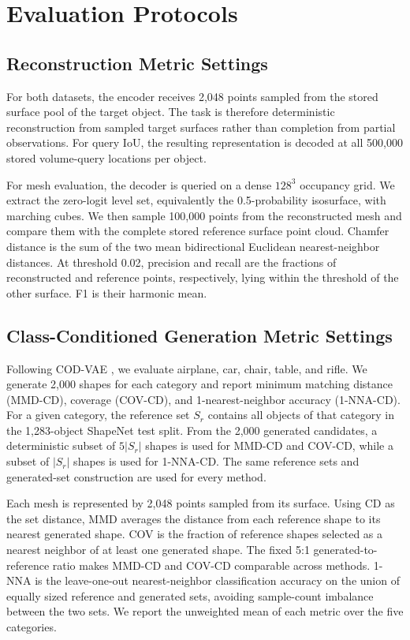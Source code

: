 \section{Evaluation Protocols}
\label{sec:evaluation}

\subsection{Reconstruction Metric Settings}

For both datasets, the encoder receives 2,048 points sampled from the stored
surface pool of the target object. The task is therefore deterministic
reconstruction from sampled target surfaces rather than completion from
partial observations. For query IoU, the resulting representation is decoded
at all 500,000 stored volume-query locations per object.

For mesh evaluation, the decoder is queried on a dense $128^3$ occupancy grid.
We extract the zero-logit level set, equivalently the 0.5-probability
isosurface, with marching cubes. We then sample 100,000 points from the
reconstructed mesh and compare them with the complete stored reference surface
point cloud. Chamfer distance is the sum of the two mean bidirectional
Euclidean nearest-neighbor distances. At threshold 0.02, precision and recall
are the fractions of reconstructed and reference points, respectively, lying
within the threshold of the other surface. F1 is their harmonic mean.

\subsection{Class-Conditioned Generation Metric Settings}

Following COD-VAE \citep{cho2025representing}, we evaluate airplane, car,
chair, table, and rifle. We generate 2,000 shapes for each category and report
minimum matching distance (MMD-CD), coverage (COV-CD), and 1-nearest-neighbor
accuracy (1-NNA-CD). For a given category, the reference set $S_r$ contains all
objects of that category in the 1,283-object ShapeNet test split. From the 2,000
generated candidates, a deterministic subset of $5|S_r|$ shapes is used for
MMD-CD and COV-CD, while a subset of $|S_r|$ shapes is used for 1-NNA-CD. The
same reference sets and generated-set construction are used for every method.

Each mesh is represented by 2,048 points sampled from its surface. Using CD as
the set distance, MMD averages the distance from each reference shape to its
nearest generated shape. COV is the fraction of reference shapes selected as a
nearest neighbor of at least one generated shape. The fixed 5:1
generated-to-reference ratio makes MMD-CD and COV-CD comparable across methods.
1-NNA is the leave-one-out nearest-neighbor classification accuracy on the
union of equally sized reference and generated sets, avoiding sample-count
imbalance between the two sets. We report the unweighted mean of each metric
over the five categories.

